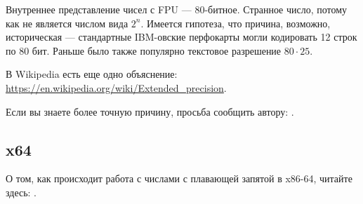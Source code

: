 Внутреннее представление чисел с FPU --- 80-битное.
Странное число, потому как не является числом вида $2^n$.
Имеется гипотеза, что причина, возможно, историческая --- стандартные IBM-овские перфокарты могли кодировать 12 строк по 80 бит.
Раньше было также популярно текстовое разрешение $80 \cdot 25$.

В Wikipedia есть еще одно объяснение: \url{https://en.wikipedia.org/wiki/Extended_precision}.

Если вы знаете более точную причину, просьба сообщить автору: \EMAIL{}.

\subsection{x64}

О том, как происходит работа с числами с плавающей запятой в x86-64, читайте здесь: .



